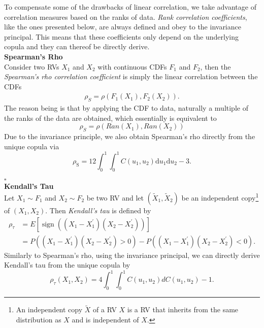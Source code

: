 
To compensate some of the drawbacks of linear correlation, we take advantage of correlation measures based on the ranks of data. \textit{Rank correlation coefficients}, like the ones presented below, are always defined and obey to the invariance principal. This means that these coefficients only depend on the underlying copula and they can thereof be directly derive.\\

\textbf{Spearman's Rho}\\
Consider two \acp{RV} $X_1$ and $X_2$ with continuous \acp{CDF} $F_1$ and $F_2$, then the \textit{Spearman's rho correlation coefficient} is simply the linear correlation between the \acp{CDF}
\begin{align}
\rho_{S}=\rho\left(F_{1}\left(X_{1}\right), F_{2}\left(X_{2}\right)\right).
\end{align}
The reason being is that by applying the \ac{CDF} to data, naturally a multiple of the ranks of the data are obtained, which essentially is equivalent to
\begin{equation}
\rho_S = \rho ( Ran(X_1), Ran(X_2) )
\end{equation}
Due to the invariance principle, we also obtain Spearman's rho directly from the unique copula via
\begin{equation}
\rho_{\mathrm{S}}=12 \int_{0}^{1} \int_{0}^{1} C\left(u_{1}, u_{2}\right) \mathrm{d} u_{1} \mathrm{d} u_{2}-3.
\end{equation}

\hfill $\square$ \\


\textbf{Kendall's Tau}\\
Let $X_1 \sim F_1$ and $X_2 \sim F_2$ be two \ac{RV} and let $(\tilde{X}_{1}, \tilde{X}_{2})$ be an independent copy\footnote{An independent copy $\tilde{X}$ of a RV $X$ is a RV that inherits from the same distribution as $X$ and is independent of $X$.} of $({X}_{1}, {X}_{2})$. Then \textit{Kendall's tau} is defined by 
\begin{equation}
\begin{aligned}
\rho_{\tau} &={E}\left[\operatorname{sign}\left(\left(X_{1}-X_{1}^{\prime}\right)\left(X_{2}-X_{2}^{\prime}\right)\right)\right] \\
&={P}\left(\left(X_{1}-X_{1}^{\prime}\right)\left(X_{2}-X_{2}^{\prime}\right)>0\right)-{P}\left(\left(X_{1}-X_{1}^{\prime}\right)\left(X_{2}-X_{2}^{\prime}\right)<0\right).
\end{aligned}
\end{equation}
Similarly to Spearman's rho, using the invariance principal, we can directly derive Kendall's tau from the unique copula by
\begin{equation}
\rho_{\tau}\left(X_{1}, X_{2}\right)=4 \int_{0}^{1} \int_{0}^{1} C\left(u_{1}, u_{2}\right) d C\left(u_{1}, u_{2}\right)-1.
\end{equation}

